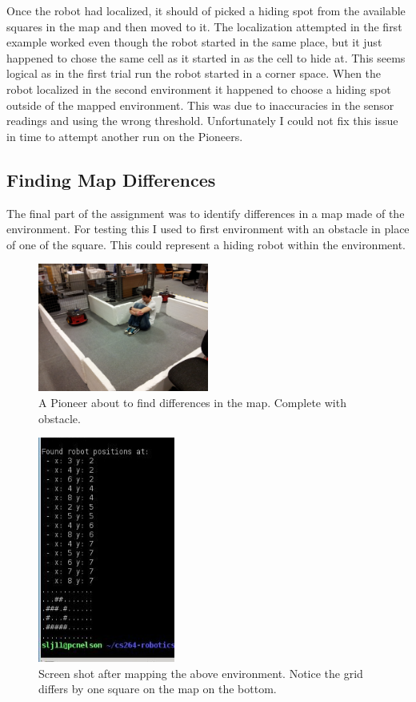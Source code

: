 \documentclass{article}
\begin{document}
Once the robot had localized, it should of picked a hiding spot from the available squares in the map and then moved to it. The localization attempted in the first example worked even though the robot started in the same place, but it just happened to chose the same cell as it started in as the cell to hide at. This seems logical as in the first trial run the robot started in a corner space. When the robot localized in the second environment it happened to choose a hiding spot outside of the mapped environment. This was due to inaccuracies in the sensor readings and using the wrong threshold. Unfortunately I could not fix this issue in time to attempt another run on the Pioneers.

\subsection{Finding Map Differences}
The final part of the assignment was to identify differences in a map made of the environment. For testing this I used to first environment with an obstacle in place of one of the square. This could represent a hiding robot within the environment.

\begin{figure}[H]
\centering
\includegraphics[width=0.5\textwidth]{img/robot_pics/20130416_135014.jpg}
\caption{A Pioneer about to find differences in the map. Complete with obstacle.}
\label{fig:robot-map-obstacle-image}
\end{figure}

\begin{figure}[H]
\centering
\includegraphics[width=0.4\textwidth]{img/robot_pics/seeker_example.jpg}
\caption{Screen shot after mapping the above environment. Notice the grid differs by one square on the map on the bottom.}
\label{fig:robot-map-obstacle}
\end{figure}
\end{document}
